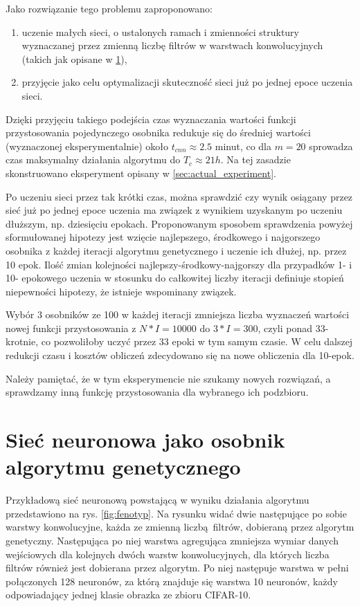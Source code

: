 Jako rozwiązanie tego problemu zaproponowano:
\begin{enumerate}
	\item uczenie małych sieci, o ustalonych ramach i zmienności struktury wyznaczanej przez zmienną liczbę filtrów w warstwach konwolucyjnych (takich jak opisane w \ref{sec:fenotyp}),
	\item przyjęcie jako celu optymalizacji skuteczność sieci już po jednej epoce uczenia sieci.
\end{enumerate}

Dzięki przyjęciu takiego podejścia czas wyznaczania wartości funkcji przystosowania pojedynczego osobnika redukuje się do średniej wartości (wyznaczonej eksperymentalnie) około $t_{cnn} \approx 2.5 $ minut, co dla $m = 20$ sprowadza czas maksymalny działania algorytmu do $T_c \approx 21 h$.
Na tej zasadzie skonstruowano eksperyment opisany w \ref{sec:actual_experiment}.

Po uczeniu sieci przez tak krótki czas, można sprawdzić czy wynik osiągany przez sieć już po jednej epoce uczenia ma związek z wynikiem uzyskanym po uczeniu dłuższym, np. dziesięciu epokach.
Proponowanym sposobem sprawdzenia powyżej sformułowanej hipotezy jest wzięcie najlepszego, środkowego i najgorszego osobnika z każdej iteracji algorytmu genetycznego i uczenie ich dłużej, np. przez 10 epok.
Ilość zmian kolejności najlepszy-środkowy-najgorszy dla przypadków 1- i 10- epokowego uczenia w stosunku do całkowitej liczby iteracji definiuje stopień niepewności hipotezy, że istnieje wspominany związek.

Wybór 3 osobników ze 100 w każdej iteracji zmniejsza liczba wyznaczeń wartości nowej funkcji przystosowania z $N*I = 10000$ do $3*I = 300$, czyli ponad 33-krotnie, co pozwoliłoby uczyć przez 33 epoki w tym samym czasie.
W celu dalszej redukcji czasu i kosztów obliczeń zdecydowano się na nowe obliczenia dla 10-epok.

Należy pamiętać, że w tym eksperymencie nie szukamy nowych rozwiązań, a sprawdzamy inną funkcję przystosowania dla wybranego ich podzbioru.

\section{Sieć neuronowa jako osobnik algorytmu genetycznego}\label{sec:fenotyp}

Przykładową sieć neuronową powstającą w wyniku działania algorytmu przedstawiono na rys. \ref{fig:fenotyp}.
Na rysunku widać dwie następujące po sobie warstwy konwolucyjne, każda ze zmienną liczbą filtrów, dobieraną przez algorytm genetyczny.
Następująca po niej warstwa agregująca zmniejsza wymiar danych wejściowych dla kolejnych dwóch warstw konwolucyjnych, dla których liczba filtrów również jest dobierana przez algorytm.
Po niej następuje warstwa w pełni połączonych 128 neuronów, za którą znajduje się warstwa 10 neuronów, każdy odpowiadający jednej klasie obrazka ze zbioru CIFAR-10.

